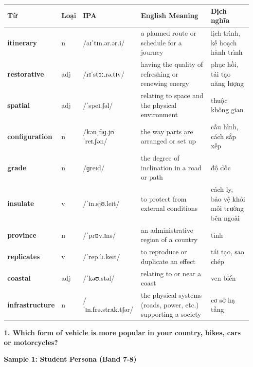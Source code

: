 \vspace{0.8em}
\begin{center}
\renewcommand{\arraystretch}{1.65}
\begin{tabularx}{\textwidth}{|V{0.22\textwidth}|C{0.07\textwidth}|I{0.20\textwidth}|Y|V{0.18\textwidth}|}
\hline
{}
\textbf{Từ} & \textbf{Loại} & \textbf{IPA} & \textbf{English Meaning} & \textbf{Dịch nghĩa} \\
\hline
\textbf{itinerary} & n & /aɪˈtɪn.ər.ər.i/ & a planned route or schedule for a journey & lịch trình, kế hoạch hành trình \\ \hline
\textbf{restorative} & adj & /rɪˈstɔː.rə.tɪv/ & having the quality of refreshing or renewing energy & phục hồi, tái tạo năng lượng \\ \hline
\textbf{spatial} & adj & /ˈspeɪ.ʃəl/ & relating to space and the physical environment & thuộc không gian \\ \hline
\textbf{configuration} & n & /kənˌfɪɡ.jʊˈreɪ.ʃən/ & the way parts are arranged or set up & cấu hình, cách sắp xếp \\ \hline
\textbf{grade} & n & /ɡreɪd/ & the degree of inclination in a road or path & độ dốc \\ \hline
\textbf{insulate} & v & /ˈɪn.sjʊ.leɪt/ & to protect from external conditions & cách ly, bảo vệ khỏi môi trường bên ngoài \\ \hline
\textbf{province} & n & /ˈprɒv.ɪns/ & an administrative region of a country & tỉnh \\ \hline
\textbf{replicates} & v & /ˈrep.lɪ.keɪt/ & to reproduce or duplicate an effect & tái tạo, sao chép \\ \hline
\textbf{coastal} & adj & /ˈkəʊ.stəl/ & relating to or near a coast & ven biển \\ \hline
\textbf{infrastructure} & n & /ˈɪn.frə.strʌk.tʃər/ & the physical systems (roads, power, etc.) supporting a society & cơ sở hạ tầng \\ \hline
\end{tabularx}
\end{center}

\partthreeheader

\begin{ieltsquestion}
\textbf{1. Which form of vehicle is more popular in your country, bikes, cars or motorcycles?}
\end{ieltsquestion}
\textbf{Sample 1: Student Persona (Band 7-8)}


